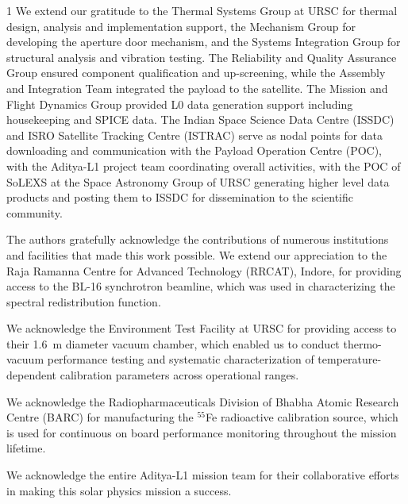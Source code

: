 \documentclass[12pt]{spieman}  %
\begin{document}
\begin{spacing}{1}
We extend our gratitude to the Thermal Systems Group at URSC for thermal design, analysis and implementation support, the Mechanism Group for developing the aperture door mechanism, and the Systems Integration Group for structural analysis and vibration testing. The Reliability and Quality Assurance Group ensured component qualification and up-screening, while the Assembly and Integration Team integrated the payload to the satellite. The Mission and Flight Dynamics Group provided L0 data generation support including housekeeping and SPICE data. The Indian Space Science Data Centre (ISSDC) and ISRO Satellite Tracking Centre (ISTRAC) serve as nodal points for data downloading and communication with the Payload Operation Centre (POC), with the Aditya-L1 project team coordinating overall activities, with the POC of SoLEXS at the Space Astronomy Group of URSC generating higher level data products and posting them to ISSDC for dissemination to the scientific community.

The authors gratefully acknowledge the contributions of numerous institutions and facilities that made this work possible. We extend our appreciation to the Raja Ramanna Centre for Advanced Technology (RRCAT), Indore, for providing access to the BL-16 synchrotron beamline, which was used in characterizing the spectral redistribution function. 

We acknowledge the Environment Test Facility at URSC for providing access to their \SI{1.6}{\metre} diameter vacuum chamber, which enabled us to conduct thermo-vacuum performance testing and systematic characterization of temperature-dependent calibration parameters across operational ranges.

We acknowledge the Radiopharmaceuticals Division of Bhabha Atomic Research Centre (BARC) for manufacturing the $^{55}$Fe radioactive calibration source, which is used for continuous on board performance monitoring throughout the mission lifetime. 

We acknowledge the entire Aditya-L1 mission team for their collaborative efforts in making this solar physics mission a success.






\end{spacing}
\end{document}
